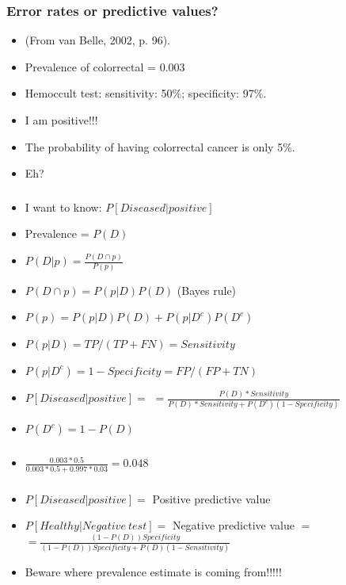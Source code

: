 \begin{frame}
\frametitle{Error rates or predictive values?}
\begin{itemize}
\item (From van Belle, 2002, p. 96).
\item  Prevalence of colorrectal = 0.003
\item Hemoccult test: sensitivity: 50\%; specificity: 97\%.
\item I am positive!!!
\pause
\item The probability of having colorrectal cancer is only 5\%.
\item Eh?
\end{itemize}
\end{frame}

\begin{frame}
\frametitle{}
\begin{itemize}
\item I want to know: $P\left[Diseased|positive\right]$
\item Prevalence = $P(D)$
\item $P(D|p) = \frac{P(D \cap p)}{P(p)}$
\item $P(D \cap p) = P(p|D) P(D)$ (Bayes rule)
\item $P(p) = P(p|D) P(D) + P(p|D^c) P(D^c)$
\item $P(p|D) = TP/(TP + FN) = Sensitivity$
\item $P(p|D^c) = 1 - Specificity = FP/(FP + TN)$
\item $P\left[Diseased|positive\right] = $
$ = \frac{P(D) * Sensitivity }{P(D) * Sensitivity + P(D^c) (1 -
  Specificity)}$
\item $ P(D^c) = 1 - P(D) $
\end{itemize}
\end{frame}


\begin{frame}
\frametitle{}
\begin{itemize}
\item $\frac{\displaystyle 0.003 * 0.5}{\displaystyle 0.003 * 0.5 + 0.997 * 0.03} = 0.048$
\end{itemize}
\end{frame}

\begin{frame}
\frametitle{}
\begin{itemize}
\item $P\left[Diseased|positive\right] =$ Positive predictive value
\vspace*{15pt}
\item $P\left[Healthy|Negative\ test\right] =$ Negative predictive value $=$
$=\frac{(1 - P(D)) Specificity}{(1 - P(D)) Specificity + P(D) (1 - Sensitivity)}$
\vspace*{15pt}
\item Beware where prevalence estimate is coming
  from!!!!!
\end{itemize}
\end{frame}



